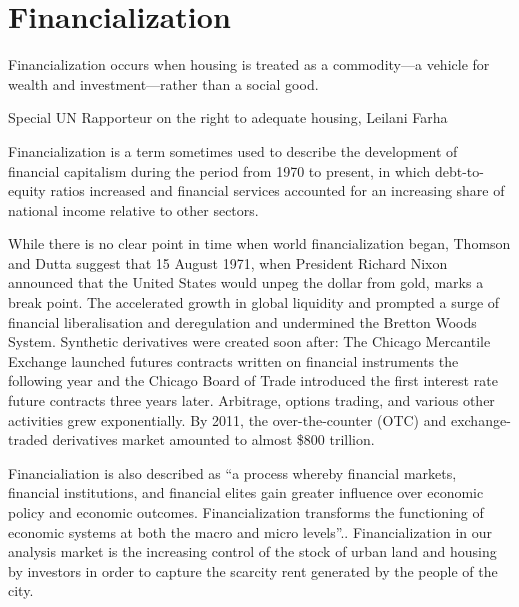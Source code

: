 \chapter{Financialization} \label{chapter-financialization}
\epigraph{Financialization  occurs when housing is treated as a commodity—a vehicle for wealth and investment—rather than a social good.}{Special UN Rapporteur on the right to adequate housing, Leilani Farha}


Financialization is a term %
sometimes used to describe the development of financial capitalism during the period from 1970 to present, in which debt-to-equity ratios increased and financial services accounted for an increasing share of national income relative to other sectors. %

While there is no clear point in time when world financialization began, Thomson and Dutta  suggest that  15 August 1971, when  President Richard Nixon announced that the United States would unpeg the dollar from gold, marks a break point.\cite{thomsonFinancialisationPrimer2018} The accelerated growth in global liquidity and prompted a surge of financial liberalisation and deregulation and undermined the Bretton Woods System.  Synthetic derivatives were created soon after: The Chicago Mercantile Exchange launched futures contracts written on financial instruments the following year and the Chicago Board of Trade introduced the first interest rate future contracts three years later. Arbitrage, options trading, and various other activities grew exponentially. By 2011, the over-the-counter (OTC) and exchange-traded derivatives market amounted to almost \$800 trillion.  %


Financialiation is also described as ``a process whereby financial markets, financial institutions, and financial elites gain greater influence over economic policy and economic outcomes. Financialization transforms the functioning of economic systems at both the macro and micro levels''.\cite{palleyFinancializationWhatIt2007}. Financialization in our analysis market is the increasing control of the stock of urban land and housing by investors in order to capture the scarcity rent generated by the people of the city.  


